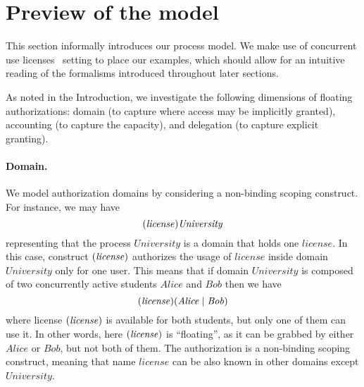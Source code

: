 \section{Preview of the model}
\label{subsec:examples}

This section informally introduces our process model. We make use of concurrent use licenses~\cite{baratti2003license} setting to place our examples, which should allow for an intuitive reading of the formalisms introduced throughout later sections. 

As noted in the Introduction, we investigate the following dimensions of floating authorizations: 
domain (to capture where access may be implicitly granted), accounting (to capture the capacity), and delegation (to capture explicit granting).

\paragraph{{Domain}.} We model authorization domains by considering a non-binding scoping 
construct. For instance, we may have  
\[
    {(\mathit{license}) \mathit{University}}
 \] 
representing that the process $\mathit{University}$ is a domain that holds one ${\mathit{license}}$. 
In this case, construct $(\mathit{license})$ authorizes the usage of $\mathit{license}$ inside domain $\mathit{University}$ only for one user.
This means that if domain $\mathit{University}$ is composed of two concurrently active students $\mathit{Alice}$ and $\mathit{Bob}$ then we have 
\[
    { (\mathit{license}) (\mathit{Alice} \;|\; \mathit{Bob})}
\]
where license $(\mathit{license})$ is available for both students, but only one of them can use it. In other words, here $(\mathit{license})$ is ``floating'', as it can be grabbed by either $\mathit{Alice}$ or $\mathit{Bob}$, but not both of them. The authorization is a non-binding scoping construct, meaning that name $\mathit{license}$ can be also known in other domains except $\mathit{University}$. 


